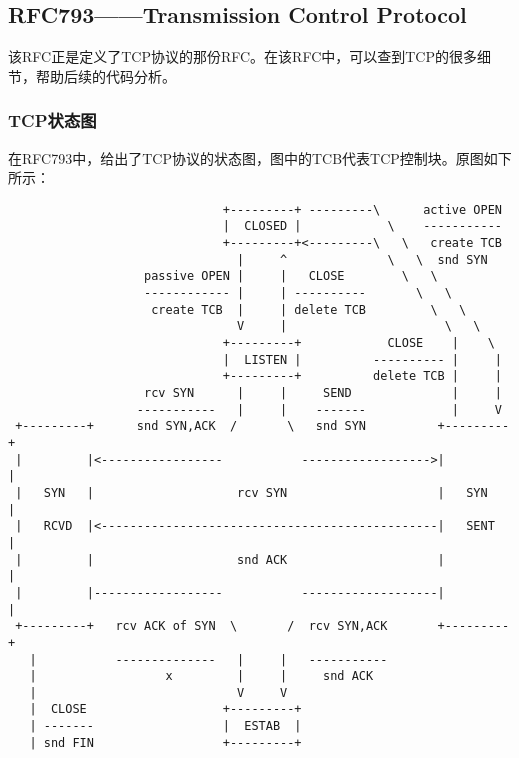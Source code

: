 \subsection{RFC793——Transmission Control Protocol}
\label{subsec:rfc793}

该RFC正是定义了TCP协议的那份RFC。在该RFC中，可以查到TCP的很多细节，帮助后续的代码分析。

\subsubsection{TCP状态图}
\label{subsubsec:tcp_state_diagram}
在RFC793中，给出了TCP协议的状态图，图中的TCB代表TCP控制块。原图如下所示：
\begin{verbatim}
                              +---------+ ---------\      active OPEN  
                              |  CLOSED |            \    -----------  
                              +---------+<---------\   \   create TCB  
                                |     ^              \   \  snd SYN    
                   passive OPEN |     |   CLOSE        \   \           
                   ------------ |     | ----------       \   \         
                    create TCB  |     | delete TCB         \   \       
                                V     |                      \   \     
                              +---------+            CLOSE    |    \   
                              |  LISTEN |          ---------- |     |  
                              +---------+          delete TCB |     |  
                   rcv SYN      |     |     SEND              |     |  
                  -----------   |     |    -------            |     V  
 +---------+      snd SYN,ACK  /       \   snd SYN          +---------+
 |         |<-----------------           ------------------>|         |
 |   SYN   |                    rcv SYN                     |   SYN   |
 |   RCVD  |<-----------------------------------------------|   SENT  |
 |         |                    snd ACK                     |         |
 |         |------------------           -------------------|         |
 +---------+   rcv ACK of SYN  \       /  rcv SYN,ACK       +---------+
   |           --------------   |     |   -----------                  
   |                  x         |     |     snd ACK                    
   |                            V     V                                
   |  CLOSE                   +---------+                              
   | -------                  |  ESTAB  |                              
   | snd FIN                  +---------+                              

\end{verbatim}
